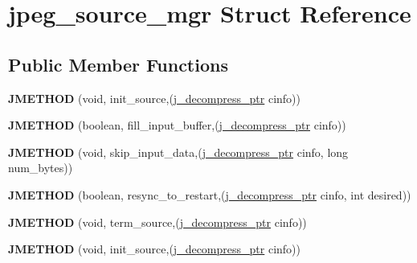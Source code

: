 \hypertarget{structjpeg__source__mgr}{\section{jpeg\-\_\-source\-\_\-mgr Struct Reference}
\label{structjpeg__source__mgr}
}
\subsection*{Public Member Functions}
\begin{DoxyCompactItemize}
\item 
\hypertarget{structjpeg__source__mgr_af8fda02c19c9dc4e505daabb77c3ad81}{{\bfseries J\-M\-E\-T\-H\-O\-D} (void, init\-\_\-source,(\hyperlink{structjpeg__decompress__struct}{j\-\_\-decompress\-\_\-ptr} cinfo))}\label{structjpeg__source__mgr_af8fda02c19c9dc4e505daabb77c3ad81}

\item 
\hypertarget{structjpeg__source__mgr_ab4a579b1f50108e2de73c7c0c1bbb9fd}{{\bfseries J\-M\-E\-T\-H\-O\-D} (boolean, fill\-\_\-input\-\_\-buffer,(\hyperlink{structjpeg__decompress__struct}{j\-\_\-decompress\-\_\-ptr} cinfo))}\label{structjpeg__source__mgr_ab4a579b1f50108e2de73c7c0c1bbb9fd}

\item 
\hypertarget{structjpeg__source__mgr_a3e29df8ddadb0c15e54b69b5a7a10305}{{\bfseries J\-M\-E\-T\-H\-O\-D} (void, skip\-\_\-input\-\_\-data,(\hyperlink{structjpeg__decompress__struct}{j\-\_\-decompress\-\_\-ptr} cinfo, long num\-\_\-bytes))}\label{structjpeg__source__mgr_a3e29df8ddadb0c15e54b69b5a7a10305}

\item 
\hypertarget{structjpeg__source__mgr_a60a35ccd1fb8d954f34c0cdbf29ac010}{{\bfseries J\-M\-E\-T\-H\-O\-D} (boolean, resync\-\_\-to\-\_\-restart,(\hyperlink{structjpeg__decompress__struct}{j\-\_\-decompress\-\_\-ptr} cinfo, int desired))}\label{structjpeg__source__mgr_a60a35ccd1fb8d954f34c0cdbf29ac010}

\item 
\hypertarget{structjpeg__source__mgr_a6c0683ce1166b9ee659b2d3aa1efb1c2}{{\bfseries J\-M\-E\-T\-H\-O\-D} (void, term\-\_\-source,(\hyperlink{structjpeg__decompress__struct}{j\-\_\-decompress\-\_\-ptr} cinfo))}\label{structjpeg__source__mgr_a6c0683ce1166b9ee659b2d3aa1efb1c2}

\item 
\hypertarget{structjpeg__source__mgr_af8fda02c19c9dc4e505daabb77c3ad81}{{\bfseries J\-M\-E\-T\-H\-O\-D} (void, init\-\_\-source,(\hyperlink{structjpeg__decompress__struct}{j\-\_\-decompress\-\_\-ptr} cinfo))}\label{structjpeg__source__mgr_af8fda02c19c9dc4e505daabb77c3ad81}


\end{DoxyCompactItemize}
